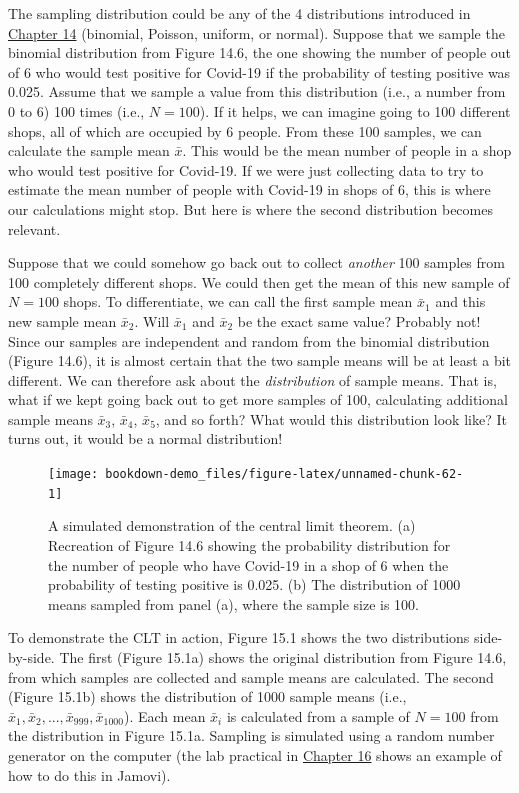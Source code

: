 \documentclass[
]{scrbook}
\begin{document}
The sampling distribution could be any of the 4 distributions introduced in \protect\hyperlink{Chapter_14}{Chapter 14} (binomial, Poisson, uniform, or normal).
Suppose that we sample the binomial distribution from Figure 14.6, the one showing the number of people out of 6 who would test positive for Covid-19 if the probability of testing positive was 0.025.
Assume that we sample a value from this distribution (i.e., a number from 0 to 6) 100 times (i.e., \(N = 100\)).
If it helps, we can imagine going to 100 different shops, all of which are occupied by 6 people.
From these 100 samples, we can calculate the sample mean \(\bar{x}\).
This would be the mean number of people in a shop who would test positive for Covid-19.
If we were just collecting data to try to estimate the mean number of people with Covid-19 in shops of 6, this is where our calculations might stop.
But here is where the second distribution becomes relevant.

Suppose that we could somehow go back out to collect \emph{another} 100 samples from 100 completely different shops.
We could then get the mean of this new sample of \(N = 100\) shops.
To differentiate, we can call the first sample mean \(\bar{x}_{1}\) and this new sample mean \(\bar{x}_{2}\).
Will \(\bar{x}_{1}\) and \(\bar{x}_{2}\) be the exact same value?
Probably not!
Since our samples are independent and random from the binomial distribution (Figure 14.6), it is almost certain that the two sample means will be at least a bit different.
We can therefore ask about the \emph{distribution} of sample means.
That is, what if we kept going back out to get more samples of 100, calculating additional sample means \(\bar{x}_{3}\), \(\bar{x}_{4}\), \(\bar{x}_{5}\), and so forth?
What would this distribution look like?
It turns out, it would be a normal distribution!

\begin{figure}
\texttt{[image: bookdown-demo\_files/figure-latex/unnamed-chunk-62-1]} \caption{A simulated demonstration of the central limit theorem. (a) Recreation of Figure 14.6 showing the probability distribution for the number of people who have Covid-19 in a shop of 6 when the probability of testing positive is 0.025. (b) The distribution of 1000 means sampled from panel (a), where the sample size is 100.}\label{fig:unnamed-chunk-62}
\end{figure}

To demonstrate the CLT in action, Figure 15.1 shows the two distributions side-by-side.
The first (Figure 15.1a) shows the original distribution from Figure 14.6, from which samples are collected and sample means are calculated.
The second (Figure 15.1b) shows the distribution of 1000 sample means (i.e., \(\bar{x}_{1}, \bar{x}_{2}, ..., \bar{x}_{999}, \bar{x}_{1000}\)).
Each mean \(\bar{x}_{i}\) is calculated from a sample of \(N = 100\) from the distribution in Figure 15.1a.
Sampling is simulated using a random number generator on the computer (the lab practical in \protect\hyperlink{Chapter_16}{Chapter 16} shows an example of how to do this in Jamovi).
\end{document}
